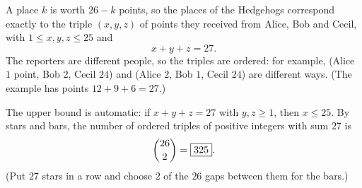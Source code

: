 A place $k$ is worth $26-k$ points, so the places of the Hedgehogs correspond exactly to the triple $(x,y,z)$ of points they received from Alice, Bob and Cecil, with $1\le x,y,z\le25$ and
\[x+y+z=27.\]
The reporters are different people, so the triples are ordered: for example, (Alice $1$ point, Bob $2$, Cecil $24$) and (Alice $2$, Bob $1$, Cecil $24$) are different ways. (The example has points $12+9+6=27$.)

The upper bound is automatic: if $x+y+z=27$ with $y,z\ge1$, then $x\le25$. By stars and bars, the number of ordered triples of positive integers with sum $27$ is
\[\dbinom{26}{2}=\boxed{325}.\]
(Put $27$ stars in a row and choose $2$ of the $26$ gaps between them for the bars.)
